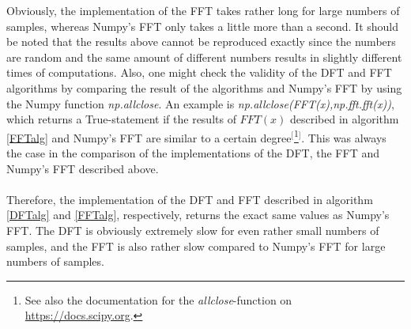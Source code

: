 Obviously, the implementation of the FFT takes rather long for large numbers of samples, whereas Numpy's FFT only takes a little more than a second. It should be noted that the results above cannot be reproduced exactly since the numbers are random and the same amount of different numbers results in slightly different times of computations. Also, one might check the validity of the DFT and FFT algorithms by comparing the result of the algorithms and Numpy's FFT by using the Numpy function \textit{np.allclose}. An example is \textit{np.allclose(FFT(x),np.fft.fft(x))}, which returns a True-statement if the results of $FFT(x)$ described in algorithm \ref{FFTalg} and Numpy's FFT are similar to a certain degree$^[$\footnote{See also the documentation for the \textit{allclose}-function on \href{https://docs.scipy.org/doc/numpy/reference/generated/numpy.allclose.html}{https://docs.scipy.org}.}$^]$. This was always the case in the comparison of the implementations of the DFT, the FFT and Numpy's FFT described above.
\\ \\
Therefore, the implementation of the DFT and FFT described in algorithm \ref{DFTalg} and \ref{FFTalg}, respectively, returns the exact same values as Numpy's FFT. The DFT is obviously extremely slow for even rather small numbers of samples, and the FFT is also rather slow compared to Numpy's FFT for large numbers of samples.
